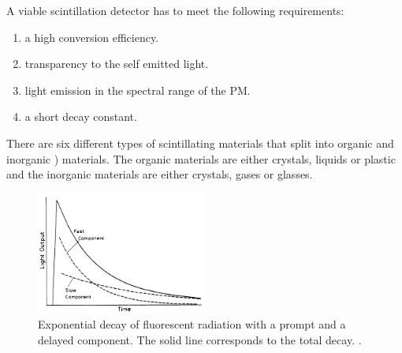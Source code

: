 \documentclass[british,11pt,a4paper]{memoir}
\begin{document}
A viable scintillation detector has to meet the following requirements:
\begin{enumerate}
	\item a high conversion efficiency.
	\item transparency to the self emitted light.
	\item light emission in the spectral range of the \ac{PM}.
	\item a short decay constant.
\end{enumerate}
There are six different types of scintillating materials that split into organic and inorganic ) materials. The organic materials are either crystals, liquids or plastic and the inorganic materials are either crystals, gases or glasses.
\begin{figure}[ht]
	\centering
	\includegraphics[width=0.5\textwidth]{decay}
	\caption{Exponential decay of fluorescent radiation with a prompt and a delayed component. The solid line corresponds to the total decay. \cite{leo}.}
	\label{pdecay}
\end{figure}\no
\end{document}
